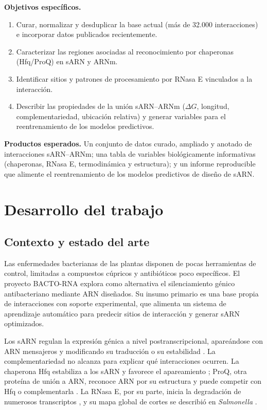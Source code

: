 \documentclass[11pt,a4paper]{article}
\newcommand{\dG}{$\Delta G$}
\begin{document}
\textbf{Objetivos específicos.}
\begin{enumerate}
  \item Curar, normalizar y desduplicar la base actual (más de 32.000 interacciones) e incorporar datos publicados recientemente.
  \item Caracterizar las regiones asociadas al reconocimiento por chaperonas (Hfq/ProQ) en sARN y ARNm.
  \item Identificar sitios y patrones de procesamiento por RNasa E vinculados a la interacción.
  \item Describir las propiedades de la unión sARN--ARNm (\dG, longitud, complementariedad, ubicación relativa) y generar variables para el reentrenamiento de los modelos predictivos.
\end{enumerate}

\textbf{Productos esperados.} Un conjunto de datos curado, ampliado y anotado de interacciones sARN--ARNm; una tabla de variables biológicamente informativas (chaperonas, RNasa E, termodinámica y estructura); y un informe reproducible que alimente el reentrenamiento de los modelos predictivos de diseño de sARN.

\section{Desarrollo del trabajo}

\subsection{Contexto y estado del arte}

Las enfermedades bacterianas de las plantas disponen de pocas herramientas de control, limitadas a compuestos cúpricos y antibióticos poco específicos. El proyecto BACTO-RNA explora como alternativa el silenciamiento génico antibacteriano mediante ARN diseñados. Su insumo primario es una base propia de interacciones con soporte experimental, que alimenta un sistema de aprendizaje automático para predecir sitios de interacción y generar sARN optimizados.

Los sARN regulan la expresión génica a nivel postranscripcional, apareándose con ARN mensajeros y modificando su traducción o su estabilidad \cite{hor2020}. La complementariedad no alcanza para explicar qué interacciones ocurren. La chaperona Hfq estabiliza a los sARN y favorece el apareamiento \cite{vogel2011}; ProQ, otra proteína de unión a ARN, reconoce ARN por su estructura \cite{holmqvist2018} y puede competir con Hfq o complementarla \cite{melamed2020}. La RNasa E, por su parte, inicia la degradación de numerosos transcriptos \cite{bandyra2018}, y su mapa global de cortes se describió en \emph{Salmonella} \cite{chao2017}.
\end{document}
